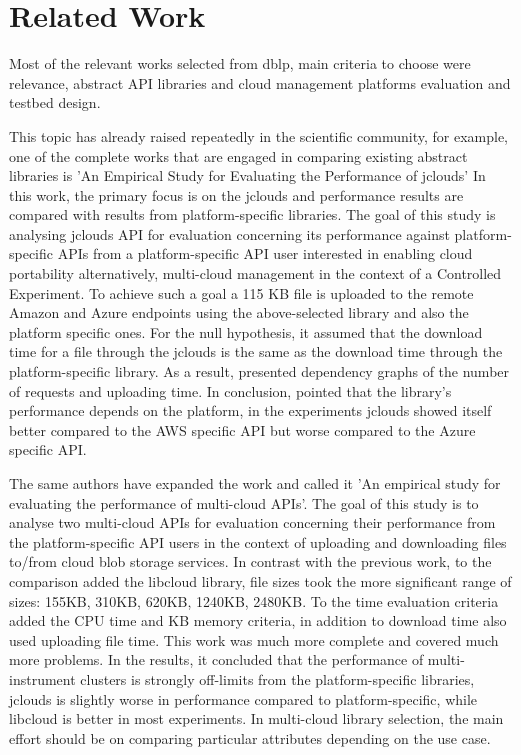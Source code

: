 \section{Related Work}
Most of the relevant works selected from dblp\cite{dblp}, main criteria to choose were relevance, abstract API libraries and cloud management platforms evaluation and testbed design.

This topic has already raised repeatedly in the scientific community, for example, one of the complete works that are engaged in comparing existing abstract libraries is 'An Empirical Study for Evaluating the Performance of jclouds\cite{jclouds}'\cite{DBLP:conf/cloudcom/IsmaelSSR15} In this work, the primary focus is on the jclouds and performance results are compared with results from platform-specific libraries. The goal of this study is analysing jclouds API for evaluation concerning its performance against platform-specific APIs from a platform-specific API user interested in enabling cloud portability alternatively, multi-cloud management in the context of a Controlled Experiment. To achieve such a goal a 115 KB file is uploaded to the remote Amazon and Azure endpoints using the above-selected library and also the platform specific ones.  For the null hypothesis, it assumed that the download time for a file through the jclouds is the same as the download time through the platform-specific library. As a result, presented dependency graphs of the number of requests and uploading time.  In conclusion, pointed that the library's performance depends on the platform, in the experiments jclouds showed itself better compared to the AWS specific API but worse compared to the Azure specific API.

The same authors have expanded the work and called it  'An empirical study for evaluating the performance of multi-cloud APIs'\cite{DBLP:journals/fgcs/ReMJIS18}.  The goal of this study is to analyse two multi-cloud APIs for evaluation concerning their performance from the platform-specific API users in the context of uploading and downloading files to/from cloud blob storage services.  In contrast with the previous work, to the comparison added the libcloud\cite{libcloud} library, file sizes took the more significant range of sizes: 155KB, 310KB, 620KB, 1240KB, 2480KB. To the time evaluation criteria added the CPU time and KB memory criteria, in addition to download time also used uploading file time. This work was much more complete and covered much more problems. In the results, it concluded that the performance of multi-instrument clusters is strongly off-limits from the platform-specific libraries, jclouds is slightly worse in performance compared to platform-specific, while libcloud is better in most experiments. In multi-cloud library selection, the main effort should be on comparing particular attributes depending on the use case.

